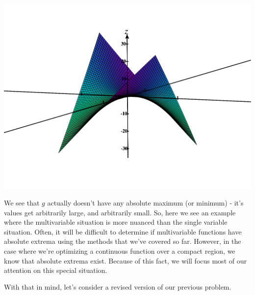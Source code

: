 \documentclass{ximera}
\begin{document}
\begin{image}
\includegraphics[width = \textwidth]{CalcPlot3D-saddle}
\end{image}

We see that $g$ actually doesn't have any absolute maximum (or minimum) - it's values get arbitrarily large, and arbitrarily small. So, here we see an example where the multivariable situation is more nuanced than the single variable situation. Often, it will be difficult to determine if multivariable functions have absolute extrema using the methods that we've covered so far. However, in the case where we're optimizing a continuous function over a compact region, we know that absolute extrema exist. Because of this fact, we will focus most of our attention on this special situation.

With that in mind, let's consider a revised version of our previous problem.
\end{document}
